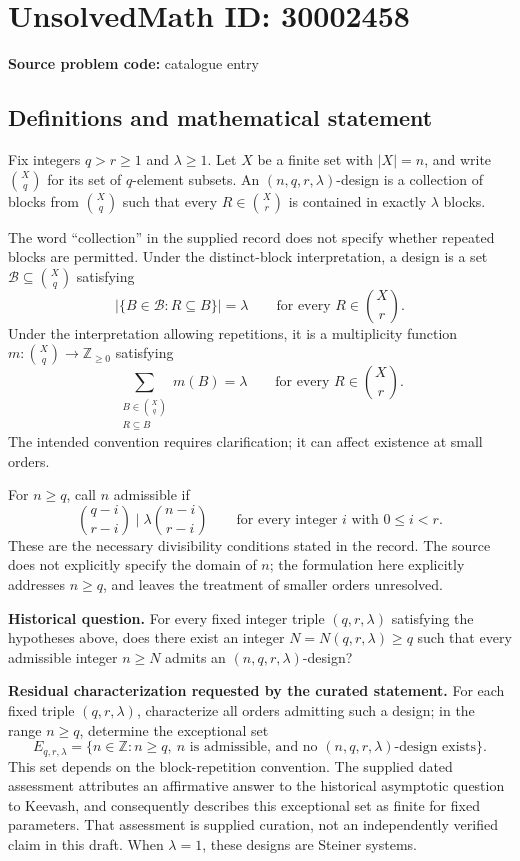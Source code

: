 \documentclass[11pt]{article}
\newcommand{\Z}{\mathbb{Z}}
\newcommand{\R}{\mathbb{R}}
\begin{document}
\section*{UnsolvedMath ID: 30002458}
\textbf{Source problem code:} catalogue entry
\subsection{Definitions and mathematical statement}
Fix integers \(q>r\geq 1\) and \(\lambda\geq 1\). Let \(X\) be a finite set with \(|X|=n\), and write \(\binom{X}{q}\) for its set of \(q\)-element subsets. An \((n,q,r,\lambda)\)-design is a collection of blocks from \(\binom{X}{q}\) such that every \(R\in\binom{X}{r}\) is contained in exactly \(\lambda\) blocks.

The word ``collection'' in the supplied record does not specify whether repeated blocks are permitted. Under the distinct-block interpretation, a design is a set \(\mathcal B\subseteq\binom{X}{q}\) satisfying
\[
\bigl|\{B\in\mathcal B:R\subseteq B\}\bigr|=\lambda
\qquad\text{for every }R\in\binom{X}{r}.
\]
Under the interpretation allowing repetitions, it is a multiplicity function \(m:\binom{X}{q}\to\Z_{\geq0}\) satisfying
\[
\sum_{\substack{B\in\binom{X}{q}\\R\subseteq B}}m(B)=\lambda
\qquad\text{for every }R\in\binom{X}{r}.
\]
The intended convention requires clarification; it can affect existence at small orders.

For \(n\geq q\), call \(n\) admissible if
\[
\binom{q-i}{r-i}\mid\lambda\binom{n-i}{r-i}
\qquad\text{for every integer }i\text{ with }0\leq i<r.
\]
These are the necessary divisibility conditions stated in the record. The source does not explicitly specify the domain of \(n\); the formulation here explicitly addresses \(n\geq q\), and leaves the treatment of smaller orders unresolved.

\textbf{Historical question.} For every fixed integer triple \((q,r,\lambda)\) satisfying the hypotheses above, does there exist an integer \(N=N(q,r,\lambda)\geq q\) such that every admissible integer \(n\geq N\) admits an \((n,q,r,\lambda)\)-design?

\textbf{Residual characterization requested by the curated statement.} For each fixed triple \((q,r,\lambda)\), characterize all orders admitting such a design; in the range \(n\geq q\), determine the exceptional set
\[
E_{q,r,\lambda}=\{n\in\Z:n\geq q,\ n\text{ is admissible, and no }(n,q,r,\lambda)\text{-design exists}\}.
\]
This set depends on the block-repetition convention. The supplied dated assessment attributes an affirmative answer to the historical asymptotic question to Keevash, and consequently describes this exceptional set as finite for fixed parameters. That assessment is supplied curation, not an independently verified claim in this draft. When \(\lambda=1\), these designs are Steiner systems.
\end{document}
